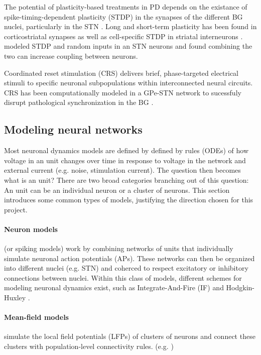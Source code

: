The potential of plasticity-based treatments in PD depends on the existance of
spike-timing-dependent plasticity (STDP) in the synapses of the different BG nuclei, particularly
in the STN \cite{rubin2012basal}. Long and short-term plasticity has been found in
corticostriatal synapses \cite{kreitzer2008striatal, di2009short} as well as cell-specific STDP in
striatal interneurons \cite{fino2010spike}.
\cite{thieu2024role} modeled STDP and random inputs in an STN neurons and found combining the two can
increase coupling between neurons.

Coordinated reset stimulation (CRS) delivers brief, phase-targeted electrical stimuli to specific
neuronal subpopulations within interconnected neural circuits.
CRS has been computationally modeled in a GPe-STN network to sucessfuly disrupt pathological
synchronization in the BG \cite{hauptmann2009cumulative, hauptmann2010restoration}.

\subsection{Modeling neural networks}
Most neuronal dynamics models are defined by defined by rules (ODEs) of how voltage in an unit changes
over time in response to voltage in the network and external current (e.g. noise, stimulation
current).
The question then becomes what is an unit? There are two broad categories branching out of this
question: An unit can be an individual neuron or a cluster of neurons. This section introduces
some common types of models, justifying the direction chosen for this project.

\paragraph{Neuron models} (or spiking models) work by combining networks of units that individually
simulate neuronal action potentials (APs).
These networks can then be organized into different nuclei (e.g. STN) and coherced to respect
excitatory or inhibitory connections between nuclei.
Within this class of models, different schemes for modeling neuronal dynamics exist,
such as Integrate-And-Fire (IF) \cite{gerstner2014if} and Hodgkin-Huxley
\cite{hodgkin1952measurement, gerstner2014hh}.

\paragraph{Mean-field models} simulate the local field potentials (LFPs) of clusters of neurons
and connect these clusters with population-level connectivity rules. (e.g.
\cite{jansen1995electroencephalogram, west2022stimulating})

